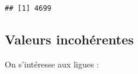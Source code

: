\documentclass[]{article}
\newenvironment{Shaded}{\begin{snugshade}}{\end{snugshade}}
\newcommand{\KeywordTok}[1]{\textcolor[rgb]{0.13,0.29,0.53}{\textbf{#1}}}
\newcommand{\NormalTok}[1]{#1}
\newcommand{\OperatorTok}[1]{\textcolor[rgb]{0.81,0.36,0.00}{\textbf{#1}}}
\begin{document}
\begin{verbatim}
## [1] 4699
\end{verbatim}

\hypertarget{valeurs-incoherentes}{%
\subsection{Valeurs incohérentes}\label{valeurs-incoherentes}}

On s'intéresse aux ligues :

\begin{Shaded}
\end{Shaded}
\end{document}
